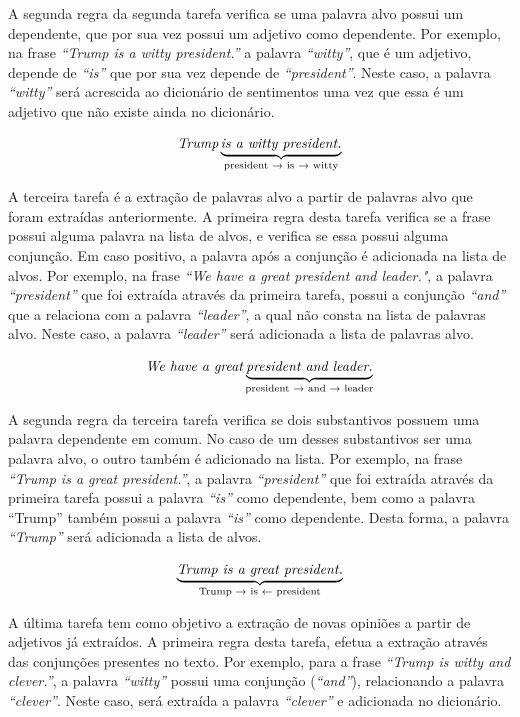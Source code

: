 A segunda regra da segunda tarefa 
verifica se uma palavra alvo possui um dependente, que por sua vez possui um
adjetivo como dependente. Por exemplo, na frase
\textit{``Trump is a witty president.''} a palavra \textit{``witty''}, que é um
adjetivo, depende de \textit{``is''} que por sua vez depende de
\textit{``president''}. Neste caso, a palavra \textit{``witty''}
será acrescida ao dicionário de sentimentos uma vez que essa é um adjetivo que
não existe ainda no dicionário.

\[\textit{Trump} \underbrace{\textit{is a witty president.}}_\text{president
\textrightarrow \text{ is} \textrightarrow \text{ witty}}\]

A terceira tarefa é a extração de palavras alvo a partir de palavras alvo que
foram extraídas anteriormente. A primeira regra desta tarefa verifica se a frase
possui alguma palavra na lista de alvos, e verifica se essa possui alguma
conjunção. Em caso positivo, a palavra após a conjunção é adicionada na lista
de alvos. Por exemplo, na frase \textit{``We have a great president and
leader."}, a palavra \textit{``president''} que foi extraída através
da primeira tarefa, possui a conjunção \textit{``and''} que a relaciona com a
palavra \textit{``leader''}, a qual não consta na lista de palavras alvo. Neste
caso, a palavra \textit{``leader''} será adicionada a lista de palavras alvo.


\[\textit{We have a great} \underbrace{\textit{president and
leader.}}_\text{president \textrightarrow \text{ and} \textrightarrow \text{
leader}}\]

A segunda regra da terceira tarefa verifica se dois substantivos
possuem uma palavra dependente em comum. No caso de um desses substantivos ser
uma palavra alvo, o outro também é adicionado na lista. Por exemplo, na frase
\textit{``Trump is a great president.''}, a palavra \textit{``president''} que
foi extraída através da primeira tarefa possui a palavra \textit{``is''} como
dependente, bem como a palavra ``Trump'' também possui a palavra \textit{``is''}
como dependente. Desta forma, a palavra \textit{``Trump''} será adicionada a
lista de alvos.

\[\underbrace{\textit{Trump is a great president.}}_\text{Trump
\textrightarrow \text{ is} \textleftarrow \text{ president}}\]



A última tarefa tem como objetivo a extração de novas opiniões a partir de
adjetivos já extraídos. A primeira regra desta tarefa, efetua a extração através
das conjunções presentes no texto. Por exemplo, para a frase \textit{``Trump is
witty and clever.''}, a palavra \textit{``witty''} possui uma conjunção
(\textit{``and''}), relacionando a palavra \textit{``clever''}. Neste caso, será
extraída a palavra \textit{``clever''} e adicionada no dicionário.


